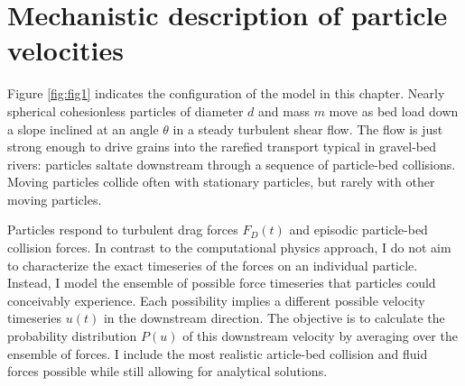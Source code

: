 \section{Mechanistic description of particle velocities}
\label{sec:langmodel}

Figure \ref{fig:fig1} indicates the configuration of the model in this chapter.
Nearly spherical cohesionless particles of diameter $d$ and mass $m$ move as bed load down a slope inclined at an angle $\theta$ in a steady turbulent shear flow.
The flow is just strong enough to drive grains into the rarefied transport typical in gravel-bed rivers: particles saltate downstream through a sequence of particle-bed collisions. 
Moving particles collide often with stationary particles, but rarely with other moving particles.

Particles respond to turbulent drag forces $F_D(t)$ and episodic particle-bed collision forces. In contrast to the computational physics approach, I do not aim to characterize the exact timeseries of the forces on an individual particle. Instead, I model the ensemble of possible force timeseries that particles could conceivably experience. Each possibility implies a different possible velocity timeseries $u(t)$ in the downstream direction.
The objective is to calculate the probability distribution $P(u)$ of this downstream velocity by averaging over the ensemble of forces.
I include the most realistic article-bed collision and fluid forces possible while still allowing for analytical solutions. 

